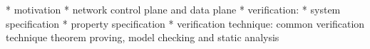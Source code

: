 
* motivation
* network control plane and data plane
* verification: 
* system specification
* property specification
* verification technique: common verification technique theorem proving, model
checking and static analysis



